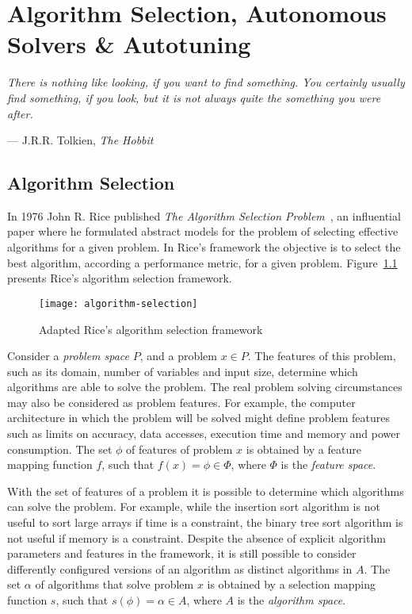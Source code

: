 \chapter{Algorithm Selection, Autonomous Solvers \& Autotuning}
\label{chap:autonomous}
\epigraph{\textit{There is nothing like looking, if you want to find something. You
certainly usually find something, if you look, but it is not always quite the
something you were after.}}{--- J.R.R. Tolkien, \textit{The Hobbit}}


\section{Algorithm Selection}
\label{sec:algselres}

In 1976 John R. Rice published \textit{The Algorithm Selection
Problem}~\cite{rice1976algorithm}, an influential paper where he formulated
abstract models for the problem of selecting effective algorithms for a given
problem. In Rice's framework the objective is to select the best algorithm,
according a performance metric, for a given problem.
Figure~\ref{fig:riceframe} presents Rice's algorithm selection framework.

\begin{figure}[htpb]
    \begin{center}
        \texttt{[image: algorithm-selection]}
    \end{center}
    \caption{Adapted Rice's algorithm selection framework~\cite{rice1976algorithm}}
    \label{fig:riceframe}
\end{figure}

Consider a \textit{problem space} $P$, and a problem $x \in P$. The features of
this problem, such as its domain, number of variables and input size, determine
which algorithms are able to solve the problem. The real problem solving
circumstances may also be considered as problem features. For example, the
computer architecture in which the problem will be solved might define problem
features such as limits on accuracy, data accesses, execution time and memory
and power consumption.  The set $\phi$ of features of problem $x$ is obtained
by a feature mapping function $f$, such that $f(x) = \phi \in \Phi$, where
$\Phi$ is the \textit{feature space}.

With the set of features of a problem it is possible to determine which
algorithms can solve the problem. For example, while the insertion sort
algorithm is not useful to sort large arrays if time is a constraint, the
binary tree sort algorithm is not useful if memory is a constraint.  Despite
the absence of explicit algorithm parameters and features in the framework,
it is still possible to consider differently configured versions of an
algorithm as distinct algorithms in $A$.  The set $\alpha$ of algorithms that
solve problem $x$ is obtained by a selection mapping function $s$, such that
$s(\phi) = \alpha \in A$, where $A$ is the \textit{algorithm space}.

